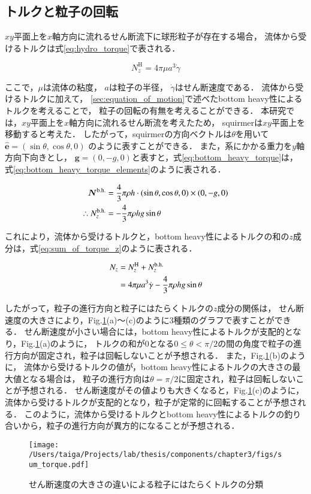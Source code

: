 \subsection{トルクと粒子の回転}
\label{sec:rotation}
$xy$平面上を$x$軸方向に流れるせん断流下に球形粒子が存在する場合，
流体から受けるトルクは式\eqref{eq:hydro_torque}で表される\cite{}．

    \begin{equation}
        N^\mathrm{H}_z = 4 \pi \mu a^3 \dot{\gamma}
        \label{eq:hydro_torque}
    \end{equation}

\noindent
ここで，$\mu$は流体の粘度，
$a$は粒子の半径，
$\dot{\gamma}$はせん断速度である．
流体から受けるトルクに加えて，
\ref{sec:equation_of_motion}で述べたbottom heavy性によるトルクを考えることで，
粒子の回転の有無を考えることができる．
本研究では，$xy$平面上を$x$軸方向に流れるせん断流を考えたため，
squirmerは$xy$平面上を移動すると考えた．
したがって，squirmerの方向ベクトルは$\theta$を用いて
$\boldsymbol{\hat{e}} = (\sin{\theta}, \cos{\theta}, 0)$
のように表すことができる．
また，系にかかる重力を$y$軸方向下向きとし，
$\boldsymbol{g} = (0, -g, 0)$と表すと，式\eqref{eq:bottom_heavy_torque}は，
式\eqref{eq:bottom_heavy_torque_elements}のように表される．

    \begin{align}
        \boldsymbol{N}^\mathrm{b.h.} &= \frac{4}{3} \pi \rho h \cdot (\sin{\theta}, \cos{\theta}, 0) \times (0, -g, 0) \notag \\
        \therefore N^\mathrm{b.h.}_z &= - \frac{4}{3} \pi \rho h g \sin{\theta}
        \label{eq:bottom_heavy_torque_elements}
    \end{align}

\noindent
これにより，流体から受けるトルクと，bottom heavy性によるトルクの和の$z$成分は，式\eqref{eq:sum_of_torque_z}のように表される．

    \begin{align}
        N_z &= N^\mathrm{H}_z + N^\mathrm{b.h.}_z \notag \\
            &= 4 \pi \mu a^3 \dot{\gamma} - \frac{4}{3} \pi \rho h g \sin{\theta}
        \label{eq:sum_of_torque_z}
    \end{align}

\noindent
したがって，粒子の進行方向と粒子にはたらくトルクの$z$成分の関係は，
せん断速度の大きさにより，Fig.\ref{fig:sum_torque}(a)〜(c)のように3種類のグラフで表すことができる．
せん断速度が小さい場合には，bottom heavy性によるトルクが支配的となり，Fig.\ref{fig:sum_torque}(a)のように，
トルクの和が0となる$0 \leq \theta < \pi / 2$の間の角度で粒子の進行方向が固定され，粒子は回転しないことが予想される．
また，Fig.\ref{fig:sum_torque}(b)のように，
流体から受けるトルクの値が，bottom heavy性によるトルクの大きさの最大値となる場合は，
粒子の進行方向は$\theta = \pi / 2$に固定され，粒子は回転しないことが予想される．
せん断速度がその値よりも大きくなると，Fig.\ref{fig:sum_torque}(c)のように，
流体から受けるトルクが支配的となり，粒子が定常的に回転することが予想される．
このように，流体から受けるトルクとbottom heavy性によるトルクの釣り合いから，粒子の進行方向が異方的になることが予想される．

\begin{figure}[H]
    \centering
    \texttt{[image: /Users/taiga/Projects/lab/thesis/components/chapter3/figs/sum\_torque.pdf]}
    \caption{せん断速度の大きさの違いによる粒子にはたらくトルクの分類}
    \label{fig:sum_torque}
\end{figure}
